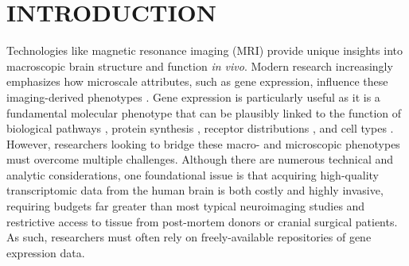 \documentclass[12pt,aps,pra,reprint,showkeys]{revtex4-1}
\begin{document}
\maketitle

\section*{INTRODUCTION}

Technologies like magnetic resonance imaging (MRI) provide unique insights into macroscopic brain structure and function \emph{in vivo}.
Modern research increasingly emphasizes how microscale attributes, such as gene expression, influence these imaging-derived phenotypes \citep{fornito2019tics, arnatkeviciute2019neuroimage, arnatkeviciute2021psyarxiv}.
Gene expression is particularly useful as it is a fundamental molecular phenotype that can be plausibly linked to the function of biological pathways \citep{whitakervertes2016pnas, seidlitz2018neuron}, protein synthesis \citep{zheng2019plosbio}, receptor distributions \citep{beliveau2017jneuro, norgaard2021neuroimage, shine2019natneuro, deco2020biorxiv, preller2018elife}, and cell types \citep{hansen2021nathumbeh, anderson2020pnas, anderson2018natcomm, seidlitz2020natcomm, gao2020elife}.
However, researchers looking to bridge these macro- and microscopic phenotypes must overcome multiple challenges.
Although there are numerous technical and analytic considerations, one foundational issue is that acquiring high-quality transcriptomic data from the human brain is both costly and highly invasive, requiring budgets far greater than most typical neuroimaging studies and restrictive access to tissue from post-mortem donors or cranial surgical patients.
As such, researchers must often rely on freely-available repositories of gene expression data.
\end{document}

